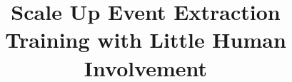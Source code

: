 \documentclass[letterpaper]{article} %
\begin{document}
%
\title{Scale Up Event Extraction Training with Little Human Involvement}
\author{}
\maketitle












\end{document}
